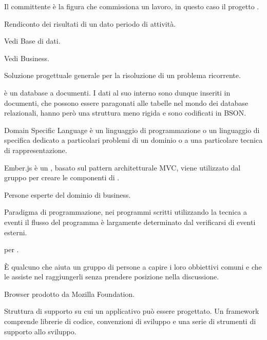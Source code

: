 Il committente è la figura che commissiona un lavoro, in questo caso il progetto \ProjectName{}.

Rendiconto  dei risultati di un dato periodo di attività.


Vedi Base di dati.

Vedi Business.

Soluzione progettuale generale per la risoluzione di un problema ricorrente.

 è un database a documenti. I dati al suo interno sono dunque inseriti in documenti, che possono essere paragonati alle tabelle nel mondo dei database relazionali, hanno però una struttura meno rigida e sono codificati in BSON.

Domain Specific Language è un linguaggio di programmazione o un linguaggio di specifica dedicato a particolari problemi di un dominio o a una particolare tecnica di rappresentazione.


Ember.js è un   , basato sul pattern architetturale MVC, viene utilizzato dal gruppo per creare le componenti  di \ProjectName{}.

Persone esperte del dominio di business.

Paradigma di programmazione, nei programmi scritti utilizzando la tecnica a eventi il flusso del programma è largamente determinato dal verificarsi di eventi esterni. 

 per .


È qualcuno che aiuta un gruppo di persone a capire i loro obbiettivi comuni e che le assiste nel raggiungerli senza prendere posizione nella discussione.

Browser  prodotto da Mozilla Foundation.

Struttura di supporto su cui un applicativo può essere progettato.
Un framework comprende librerie di codice, convenzioni di sviluppo e una serie di strumenti di supporto allo sviluppo.

